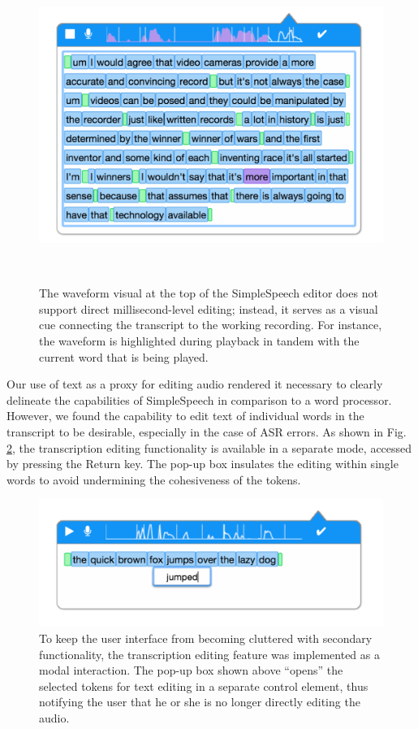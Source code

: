 \begin{figure}
	\centering
	\includegraphics[width=\columnwidth,keepaspectratio]{figures/playback}
	\caption{The waveform visual at the top of the SimpleSpeech editor does not support direct millisecond-level editing; instead, it serves as a visual cue connecting the transcript to the working recording. For instance, the waveform is highlighted during playback in tandem with the current word that is being played.}~\label{fig:playback}
\end{figure}

Our use of text as a proxy for editing audio rendered it necessary to clearly delineate the capabilities of SimpleSpeech in comparison to a word processor.
However, we found the capability to edit text of individual words in the transcript to be desirable, especially in the case of ASR errors.
As shown in Fig. \ref{fig:transcription}, the transcription editing functionality is available in a separate mode, accessed by pressing the Return key.
The pop-up box insulates the editing within single words to avoid undermining the cohesiveness of the tokens. 

\begin{figure}
	\centering
	\includegraphics[width=\columnwidth,keepaspectratio]{figures/transcription_edit}
	\caption{To keep the user interface from becoming cluttered with secondary functionality, the transcription editing feature was implemented as a modal interaction. The pop-up box shown above ``opens'' the selected tokens for text editing in a separate control element, thus notifying the user that he or she is no longer directly editing the audio.}
	\label{fig:transcription}
\end{figure}